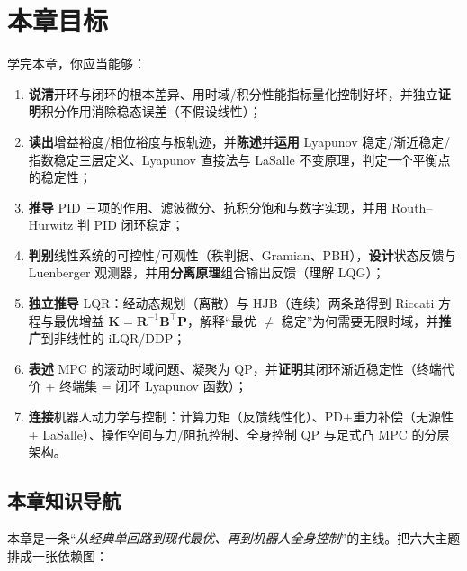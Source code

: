\section*{本章目标}
学完本章，你应当能够：
\begin{enumerate}
  \item \textbf{说清}开环与闭环的根本差异、用时域/积分性能指标量化控制好坏，并独立\textbf{证明}积分作用消除稳态误差（不假设线性）；
  \item \textbf{读出}增益裕度/相位裕度与根轨迹，并\textbf{陈述}并\textbf{运用} Lyapunov 稳定/渐近稳定/指数稳定三层定义、Lyapunov 直接法与 LaSalle 不变原理，判定一个平衡点的稳定性；
  \item \textbf{推导} PID 三项的作用、滤波微分、抗积分饱和与数字实现，并用 Routh--Hurwitz 判 PID 闭环稳定；
  \item \textbf{判别}线性系统的可控性/可观性（秩判据、Gramian、PBH），\textbf{设计}状态反馈与 Luenberger 观测器，并用\textbf{分离原理}组合输出反馈（理解 LQG）；
  \item \textbf{独立推导} LQR：经动态规划（离散）与 HJB（连续）两条路得到 Riccati 方程与最优增益 $\mathbf{K}=\mathbf{R}^{-1}\mathbf{B}^\top\mathbf{P}$，解释“最优 $\ne$ 稳定”为何需要无限时域，并\textbf{推广}到非线性的 iLQR/DDP；
  \item \textbf{表述} MPC 的滚动时域问题、凝聚为 QP，并\textbf{证明}其闭环渐近稳定性（终端代价 + 终端集 = 闭环 Lyapunov 函数）；
  \item \textbf{连接}机器人动力学与控制：计算力矩（反馈线性化）、PD+重力补偿（无源性 + LaSalle）、操作空间与力/阻抗控制、全身控制 QP 与足式凸 MPC 的分层架构。
\end{enumerate}

\subsection*{本章知识导航}
本章是一条“\emph{从经典单回路到现代最优、再到机器人全身控制}”的主线。把六大主题排成一张依赖图：

